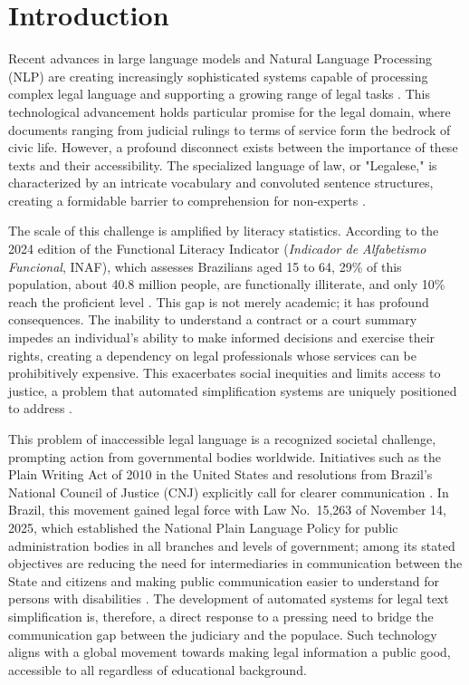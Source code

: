 \documentclass[english]{UNISINOSartigo} %
\begin{document}
\section{Introduction}

Recent advances in large language models and Natural Language Processing (NLP) are creating increasingly sophisticated systems capable of processing complex legal language and supporting a growing range of legal tasks \cite{he2026legal}. This technological advancement holds particular promise for the legal domain, where documents ranging from judicial rulings to terms of service form the bedrock of civic life. However, a profound disconnect exists between the importance of these texts and their accessibility. The specialized language of law, or "Legalese," is characterized by an intricate vocabulary and convoluted sentence structures, creating a formidable barrier to comprehension for non-experts \cite{lai2024llmslaw}.

The scale of this challenge is amplified by literacy statistics. According to the 2024 edition of the Functional Literacy Indicator (\textit{Indicador de Alfabetismo Funcional}, INAF), which assesses Brazilians aged 15 to 64, 29\% of this population, about 40.8 million people, are functionally illiterate, and only 10\% reach the proficient level \cite{inaf2024}. This gap is not merely academic; it has profound consequences. The inability to understand a contract or a court summary impedes an individual's ability to make informed decisions and exercise their rights, creating a dependency on legal professionals whose services can be prohibitively expensive. This exacerbates social inequities and limits access to justice, a problem that automated simplification systems are uniquely positioned to address \cite{agrawal2024do}.

This problem of inaccessible legal language is a recognized societal challenge, prompting action from governmental bodies worldwide. Initiatives such as the Plain Writing Act of 2010 in the United States and resolutions from Brazil's National Council of Justice (CNJ) explicitly call for clearer communication \cite{alves2023automatic}. In Brazil, this movement gained legal force with Law No.~15,263 of November 14, 2025, which established the National Plain Language Policy for public administration bodies in all branches and levels of government; among its stated objectives are reducing the need for intermediaries in communication between the State and citizens and making public communication easier to understand for persons with disabilities \cite{brasil2025linguagem}. The development of automated systems for legal text simplification is, therefore, a direct response to a pressing need to bridge the communication gap between the judiciary and the populace. Such technology aligns with a global movement towards making legal information a public good, accessible to all regardless of educational background.
\end{document}
